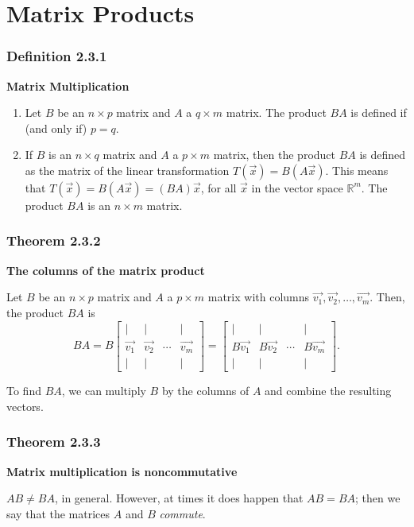 \documentclass{report}
\begin{document}
\section{Matrix Products}
\subsubsection*{Definition 2.3.1}
\par\noindent\textbf{Matrix Multiplication}
\renewcommand{\labelenumi}{\textbf{\alph{enumi}.}}
\begin{enumerate}
\item Let $B$ be an $n\times{}p$ matrix and $A$ a $q\times{}m$ matrix. The product $BA$ is defined if (and only if) $p=q$.
\item If $B$ is an $n\times{}q$ matrix and $A$ a $p\times{}m$ matrix, then the product $BA$ is defined as the matrix of the linear transformation $T(\vec{x})=B(A\vec{x})$. This means that $T(\vec{x})=B(A\vec{x})=(BA)\vec{x}$, for all $\vec{x}$ in the vector space $\mathbb{R}^{m}$. The product $BA$ is an $n\times{}m$ matrix.
\end{enumerate}
\subsubsection*{Theorem 2.3.2}
\par\noindent\textbf{The columns of the matrix product}
\par\noindent Let $B$ be an $n\times{}p$ matrix and $A$ a $p\times{}m$ matrix with columns $\vec{v_{1}},\vec{v_{2}},\ldots{},\vec{v_{m}}$. Then, the product $BA$ is
\[BA=B\left[\begin{array}{cccc}|&|&&|\\ \vec{v_{1}}&\vec{v_{2}}&\cdots{}&\vec{v_{m}}\\ |&|&&|\end{array}\right]=\left[\begin{array}{cccc}|&|&&|\\ B\vec{v_{1}}&B\vec{v_{2}}&\cdots{}&B\vec{v_{m}}\\ |&|&&|\end{array}\right].\]
\par\noindent To find $BA$, we can multiply $B$ by the columns of $A$ and combine the resulting vectors.
\subsubsection*{Theorem 2.3.3}
\par\noindent\textbf{Matrix multiplication is noncommutative}
\par\noindent $AB\ne{}BA$, in general. However, at times it does happen that $AB=BA$; then we say that the matrices $A$ and $B$ \textit{commute}.
\end{document}
